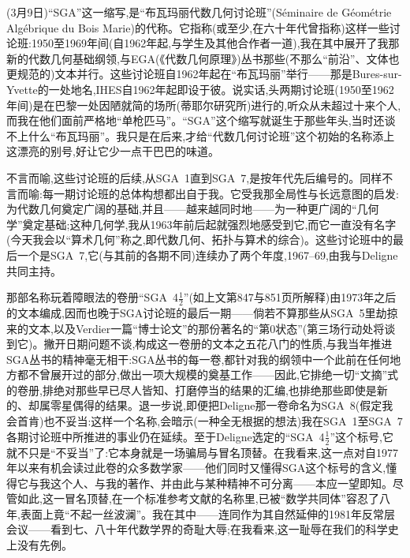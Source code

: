 
(3月9日)“SGA”这一缩写,是“布瓦玛丽代数几何讨论班”(Séminaire de Géométrie Algébrique du Bois Marie)的代称。它指称(或至少,在六十年代曾指称)这样一些讨论班:1950至1969年间(自1962年起,与学生及其他合作者一道),我在其中展开了我那新的代数几何基础纲领,与EGA(《代数几何原理》)丛书那些(不那么“前沿”、文体也更规范的)文本并行。这些讨论班自1962年起在“布瓦玛丽”举行——那是Bures-sur-Yvette的一处地名,IHES自1962年起即设于彼。说实话,头两期讨论班(1950至1962年间)是在巴黎一处因陋就简的场所(蒂耶尔研究所)进行的,听众从未超过十来个人,而我在他们面前严格地“单枪匹马”。“SGA”这个缩写就诞生于那些年头,当时还谈不上什么“布瓦玛丽”。我只是在后来,才给“代数几何讨论班”这个初始的名称添上这漂亮的别号,好让它少一点干巴巴的味道。

不言而喻,这些讨论班的后续,从SGA~1直到SGA~7,是按年代先后编号的。同样不言而喻:每一期讨论班的总体构想都出自于我。它受我那全局性与长远意图的启发:为代数几何奠定广阔的基础,并且——越来越同时地——为一种更广阔的“几何学”奠定基础;这种几何学,我从1963年前后起就强烈地感受到它,而它一直没有名字(今天我会以“算术几何”称之,即代数几何、拓扑\dmark{}与算术的综合)。这些讨论班中的最后一个是SGA~7,它(与其前的各期不同)连续办了两个年度,1967--69,由我与Deligne共同主持。

那部名称玩着障眼法的卷册“SGA~4$\frac{1}{2}$”(如上文第847与851页所解释)由1973年之后的文本编成,因而也晚于SGA讨论班的最后一期——倘若不算那些从SGA~5里劫掠来的文本,以及Verdier一篇“博士论文”的那份著名的“第0状态”(第三场行动处将谈到它)。撇开日期问题不谈,构成这一卷册的文本之五花八门的性质,与我当年推进SGA丛书的精神毫无相干:SGA丛书的每一卷,都针对我的纲领中一个此前在任何地方都不曾展开过的部分,做出一项大规模的奠基工作——因此,它排绝一切“文摘”式的卷册,排绝对那些早已尽人皆知、打磨停当的结果的汇编,也排绝那些即使是新的、却属零星偶得的结果。退一步说,即便把Deligne那一卷命名为SGA~8(假定我会首肯)也不妥当:这样一个名称,会暗示(一种全无根据的想法)我在SGA~1至SGA~7各期讨论班中所推进的事业仍在延续。至于Deligne选定的“SGA~4$\frac{1}{2}$”这个标号,它就不只是“不妥当”了:它本身就是一场骗局与冒名顶替。在我看来,这一点对自1977年以来有机会读过此卷的众多数学家——他们同时又懂得SGA这个标号的含义,懂得它与我这个人、与我的著作、并由此与某种精神不可分离——本应一望即知。尽管如此,这一冒名顶替,在一个标准参考文献的名称里,已被“数学共同体”容忍了八年,表面上竟“不起一丝波澜”。我在其中——连同作为其自然延伸的1981年反常层会议——看到七、八十年代数学界的奇耻大辱;在我看来,这一耻辱在我们的科学史上没有先例。

